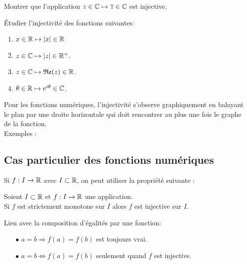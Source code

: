 \documentclass[a4paper, 11pt]{article}
\begin{document}
\begin{exercice}
	Montrer que l'application $z \in \mathbb{C} \mapsto \overline{z} \in \mathbb{C}$ est injective.
\end{exercice}



\begin{exercice}
	\'Etudier l'injectivit\'e des fonctions suivantes:
	\begin{enumerate}

		\item $x\in\mathbb{R}\mapsto |x|\in\mathbb{R}$
		\item $z\in\mathbb{C}\mapsto |z|\in\mathbb{R}^+$.


		\item  $z\in\mathbb{C}\mapsto \mathfrak{Re}{(z)}\in\mathbb{R}$.
		\item $\theta \in\mathbb{R}\mapsto e^{i\theta} \in\mathbb{C}$.

	\end{enumerate}
\end{exercice}





\begin{rem}
	Pour les fonctions num\'eriques, l'injectivit\'e s'observe graphiquement en balayant le plan par une droite horizontale qui doit rencontrer au plus une fois le graphe de la fonction.\\
	\noindent Exemples :

\end{rem}


\subsection{Cas particulier des fonctions num\'eriques}

\noindent Si $f:I\to \mathbb{R}$ avec $I \subset \mathbb{R}$, on peut utiliser la propri\'et\'e suivante :\\


\begin{prop} Soient $I\subset \mathbb{R}$ et $f: I\rightarrow \mathbb{R}$ une application.\vsec\\
	Si $f$ est strictement monotone sur $I$ alors  $f$ est injective sur $I$.
\end{prop}




\begin{rem} Lien avec la composition d'\'egalit\'es par une fonction:
	\begin{itemize}
		\item[$\bullet$] $a=b\Longrightarrow f(a)=f(b)$ est toujours vrai.
		\item[$\bullet$] $a=b \Longleftrightarrow f(a)=f(b)$ seulement quand $f$ est injective.
	\end{itemize}
\end{rem}
\end{document}
